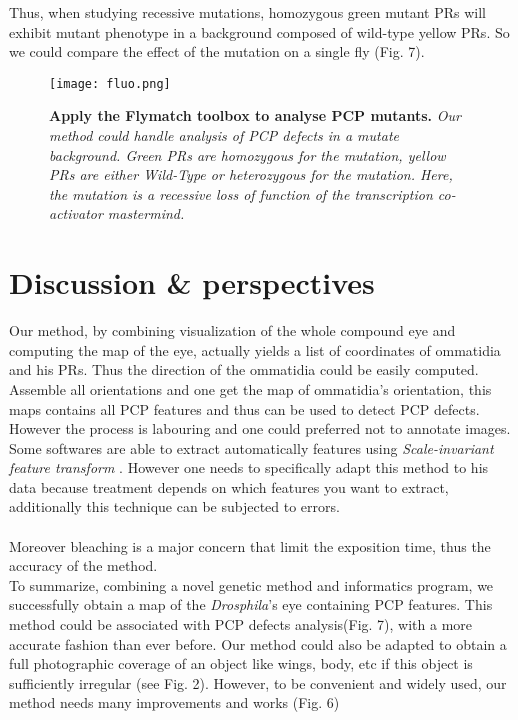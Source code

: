 \documentclass{article}
\begin{document}
 Thus, when studying recessive mutations, homozygous green mutant PRs will exhibit mutant phenotype in a background composed of wild-type yellow PRs. So we could compare the effect of the mutation on a single fly (Fig. 7).
\begin{figure}[H]
	  \centering
  	\texttt{[image: fluo.png]}
  	\caption{\textbf{Apply the Flymatch toolbox to analyse PCP mutants.} \textsl{Our method could handle analysis of PCP defects in a mutate background. Green PRs are homozygous for the mutation, yellow PRs are either Wild-Type or heterozygous for the mutation. Here, the mutation is a recessive loss of function of the transcription co-activator mastermind.}}
	\end{figure}
	

\section{Discussion \& perspectives}
Our method, by combining visualization of the whole compound eye and computing the map of the eye, actually yields a list of coordinates of ommatidia and his PRs. Thus the direction of the ommatidia could be easily computed. Assemble all orientations and one get the map of ommatidia's orientation, this maps contains all PCP features and thus can be used to detect PCP defects.
However the process is labouring and one could preferred not to annotate images. Some softwares are able to extract automatically features using \textit{Scale-invariant feature transform} \cite{ref5}. However one needs to specifically adapt this method to his data because treatment depends on which features you want to extract, additionally this technique can be subjected to errors. \\
\\Moreover bleaching is a major concern that limit the exposition time, thus the accuracy of the method. \\ 
To summarize, combining a novel genetic method and informatics program, we successfully obtain a map of the \textit{Drosphila}'s eye containing PCP features. This method could be associated with PCP defects analysis(Fig. 7), with a more accurate fashion than ever before. Our method could also be adapted to obtain a full photographic coverage of an object like wings, body, etc if this object is sufficiently irregular (see Fig. 2). However, to be convenient and widely used, our method needs many improvements and works (Fig. 6)
\end{document}
